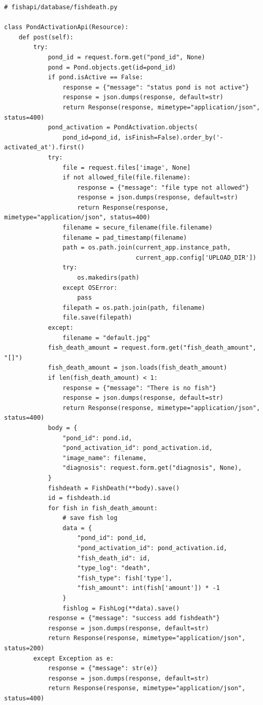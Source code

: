 \begin{enumerate}[1.]
\begin{lstlisting}
# fishapi/database/fishdeath.py

class PondActivationApi(Resource):
    def post(self):
        try:
            pond_id = request.form.get("pond_id", None)
            pond = Pond.objects.get(id=pond_id)
            if pond.isActive == False:
                response = {"message": "status pond is not active"}
                response = json.dumps(response, default=str)
                return Response(response, mimetype="application/json", status=400)
            pond_activation = PondActivation.objects(
                pond_id=pond_id, isFinish=False).order_by('-activated_at').first()
            try:
                file = request.files['image', None]
                if not allowed_file(file.filename):
                    response = {"message": "file type not allowed"}
                    response = json.dumps(response, default=str)
                    return Response(response, mimetype="application/json", status=400)
                filename = secure_filename(file.filename)
                filename = pad_timestamp(filename)
                path = os.path.join(current_app.instance_path,
                                    current_app.config['UPLOAD_DIR'])
                try:
                    os.makedirs(path)
                except OSError:
                    pass
                filepath = os.path.join(path, filename)
                file.save(filepath)
            except:
                filename = "default.jpg"
            fish_death_amount = request.form.get("fish_death_amount", "[]")
            fish_death_amount = json.loads(fish_death_amount)
            if len(fish_death_amount) < 1:
                response = {"message": "There is no fish"}
                response = json.dumps(response, default=str)
                return Response(response, mimetype="application/json", status=400)
            body = {
                "pond_id": pond.id,
                "pond_activation_id": pond_activation.id,
                "image_name": filename,
                "diagnosis": request.form.get("diagnosis", None),
            }
            fishdeath = FishDeath(**body).save()
            id = fishdeath.id
            for fish in fish_death_amount:
                # save fish log
                data = {
                    "pond_id": pond_id,
                    "pond_activation_id": pond_activation.id,
                    "fish_death_id": id,
                    "type_log": "death",
                    "fish_type": fish['type'],
                    "fish_amount": int(fish['amount']) * -1
                }
                fishlog = FishLog(**data).save()
            response = {"message": "success add fishdeath"}
            response = json.dumps(response, default=str)
            return Response(response, mimetype="application/json", status=200)
        except Exception as e:
            response = {"message": str(e)}
            response = json.dumps(response, default=str)
            return Response(response, mimetype="application/json", status=400)
\end{lstlisting}


\end{enumerate}
